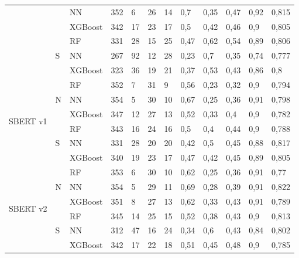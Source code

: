 \documentclass[conference]{IEEEtran}
\begin{document}
\begin{table}[t]
\begin{tabular}{llllllllllll}
                                   &                    & NN      & 352 & 6  & 26 & 14 & 0,7  & 0,35 & 0,47  & 0,92    & 0,815    \\ \cline{3-12} 
                                   &                    & XGBoost & 342 & 17 & 23 & 17 & 0,5  & 0,42 & 0,46  & 0,9     & 0,805    \\ \cline{2-12} 
                                   & \multirow{3}{*}{S} & RF      & 331 & 28 & 15 & 25 & 0,47 & 0,62 & 0,54  & 0,89    & 0,806    \\ \cline{3-12} 
                                   &                    & NN      & 267 & 92 & 12 & 28 & 0,23 & 0,7  & 0,35  & 0,74    & 0,777    \\ \cline{3-12} 
                                   &                    & XGBoost & 323 & 36 & 19 & 21 & 0,37 & 0,53 & 0,43  & 0,86    & 0,8      \\ \hline
\multirow{6}{*}{SBERT v1}          & \multirow{3}{*}{N} & RF      & 352 & 7  & 31 & 9  & 0,56 & 0,23 & 0,32  & 0,9     & 0,794    \\ \cline{3-12} 
                                   &                    & NN      & 354 & 5  & 30 & 10 & 0,67 & 0,25 & 0,36  & 0,91    & 0,798    \\ \cline{3-12} 
                                   &                    & XGBoost & 347 & 12 & 27 & 13 & 0,52 & 0,33 & 0,4   & 0,9     & 0,782    \\ \cline{2-12} 
                                   & \multirow{3}{*}{S} & RF      & 343 & 16 & 24 & 16 & 0,5  & 0,4  & 0,44  & 0,9     & 0,788    \\ \cline{3-12} 
                                   &                    & NN      & 331 & 28 & 20 & 20 & 0,42 & 0,5  & 0,45  & 0,88    & 0,817    \\ \cline{3-12} 
                                   &                    & XGBoost & 340 & 19 & 23 & 17 & 0,47 & 0,42 & 0,45  & 0,89    & 0,805    \\ \hline
\multirow{6}{*}{SBERT v2}          & \multirow{3}{*}{N} & RF      & 353 & 6  & 30 & 10 & 0,62 & 0,25 & 0,36  & 0,91    & 0,77     \\ \cline{3-12} 
                                   &                    & NN      & 354 & 5  & 29 & 11 & 0,69 & 0,28 & 0,39  & 0,91    & 0,822    \\ \cline{3-12} 
                                   &                    & XGBoost & 351 & 8  & 27 & 13 & 0,62 & 0,33 & 0,43  & 0,91    & 0,789    \\ \cline{2-12} 
                                   & \multirow{3}{*}{S} & RF      & 345 & 14 & 25 & 15 & 0,52 & 0,38 & 0,43  & 0,9     & 0,813    \\ \cline{3-12} 
                                   &                    & NN      & 312 & 47 & 16 & 24 & 0,34 & 0,6  & 0,43  & 0,84    & 0,802    \\ \cline{3-12} 
                                   &                    & XGBoost & 342 & 17 & 22 & 18 & 0,51 & 0,45 & 0,48  & 0,9     & 0,785    \\ \hline
\end{tabular}
\end{table}
\end{document}
